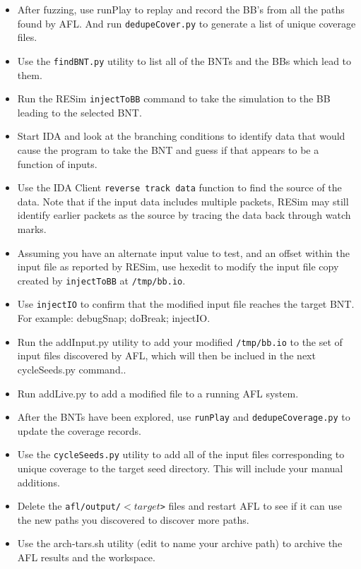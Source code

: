 \documentclass[titlepage]{article}
\begin{document}
\begin{itemize}
\item After fuzzing, use runPlay to replay and record the BB's from all the paths found by AFL.  And run {\tt dedupeCover.py} to generate a list of unique coverage files.
\item Use the {\tt findBNT.py} utility to list all of the BNTs and the BBs which lead to them.
\item Run the RESim {\tt injectToBB} command to take the simulation to the BB leading to the selected BNT.
\item Start IDA and look at the branching conditions to identify data that would cause the program to take the BNT and guess if that appears to be a function of inputs.  
\item Use the IDA Client {\tt reverse track data} function to find the source of the data.  Note that if the input data includes multiple packets, RESim may still
identify earlier packets as the source by tracing the data back through watch marks.
\item Assuming you have an alternate input value to test, and an offset within the input file as reported by RESim, use hexedit to modify the input file copy
created by {\tt injectToBB} at {\tt /tmp/bb.io}.
\item Use {\tt injectIO} to confirm that the modified input file reaches the target BNT.  For example: debugSnap; doBreak; injectIO.
\item Run the addInput.py utility to add your modified {\tt /tmp/bb.io} to the set of input files discovered by AFL, which will then be inclued in the next
cycleSeeds.py command..
\item Run addLive.py to add a modified file to a running AFL system.
\item After the BNTs have been explored, use {\tt runPlay} and {\tt dedupeCoverage.py} to update the coverage records.
\item Use the {\tt cycleSeeds.py} utility to add all of the input files corresponding to unique coverage to the target seed directory.  This will include your manual additions.
\item Delete the {\tt afl/output/$<target$>} files and restart AFL to see if it can use the new paths you discovered to discover more paths.
\item Use the arch-tars.sh utility (edit to name your archive path) to archive the AFL results and the workspace.
\end{itemize}
\end{document}
